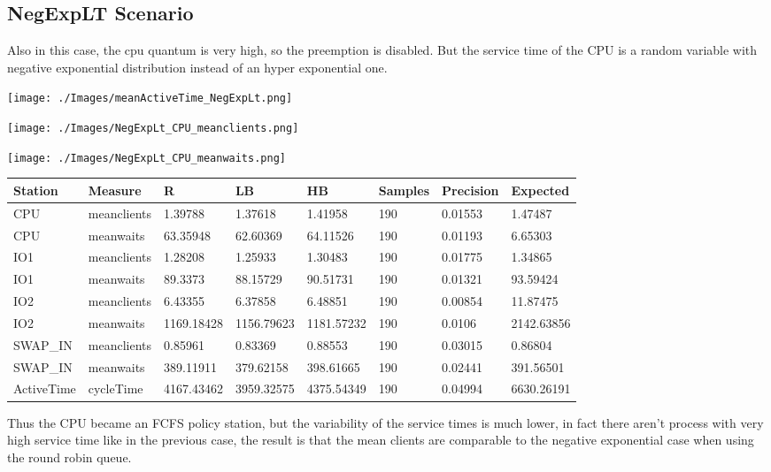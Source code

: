 \documentclass[12pt,a4paper]{article}
\begin{document}
\subsection{NegExpLT Scenario}

Also in this case, the cpu quantum is very high, so the preemption is disabled. But the service time of the CPU is a random variable with negative exponential distribution instead of an hyper exponential one.

\texttt{[image: ./Images/meanActiveTime\_NegExpLt.png]}

\texttt{[image: ./Images/NegExpLt\_CPU\_meanclients.png]}

\texttt{[image: ./Images/NegExpLt\_CPU\_meanwaits.png]}


\begin{table}[!ht]
    \centering
    \begin{tabular}{|l|l|l|l|l|l|l|l|}
    \hline
        Station & Measure & R & LB & HB & Samples & Precision & Expected \\ \hline
        CPU & meanclients & 1.39788 & 1.37618 & 1.41958 & 190 & 0.01553 & 1.47487 \\ \hline
        CPU & meanwaits & 63.35948 & 62.60369 & 64.11526 & 190 & 0.01193 & 6.65303 \\ \hline
        IO1 & meanclients & 1.28208 & 1.25933 & 1.30483 & 190 & 0.01775 & 1.34865 \\ \hline
        IO1 & meanwaits & 89.3373 & 88.15729 & 90.51731 & 190 & 0.01321 & 93.59424 \\ \hline
        IO2 & meanclients & 6.43355 & 6.37858 & 6.48851 & 190 & 0.00854 & 11.87475 \\ \hline
        IO2 & meanwaits & 1169.18428 & 1156.79623 & 1181.57232 & 190 & 0.0106 & 2142.63856 \\ \hline
        SWAP\_IN & meanclients & 0.85961 & 0.83369 & 0.88553 & 190 & 0.03015 & 0.86804 \\ \hline
        SWAP\_IN & meanwaits & 389.11911 & 379.62158 & 398.61665 & 190 & 0.02441 & 391.56501 \\ \hline
        ActiveTime & cycleTime & 4167.43462 & 3959.32575 & 4375.54349 & 190 & 0.04994 & 6630.26191 \\ \hline
    \end{tabular}
\end{table}

Thus the CPU became an FCFS policy station, but the variability of the service times is much lower, in fact there aren't process with very high service time like in the previous case, the result is that the mean clients are comparable to the negative exponential case when using the round robin queue. 
\end{document}
